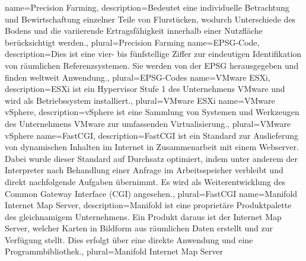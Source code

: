 {
  name=Precision Farming,
  description={Bedeutet eine individuelle Betrachtung und Bewirtschaftung einzelner Teile von Flurstücken, wodurch Unterschiede des Bodens und die variierende Ertragsfähigkeit innerhalb einer Nutzfläche berücksichtigt werden.},
  plural=Precision Farming
}
{
  name=EPSG-Code,
  description={Dies ist eine vier- bis fünfstellige Ziffer zur eindeutigen Identifikation von räumlichen Referenzsystemen. Sie werden von der EPSG herausgegeben und finden weltweit Anwendung.},
  plural=EPSG-Codes
}
{
  name=VMware ESXi,
  description={ESXi ist ein Hypervisor Stufe 1 des Unternehmens VMware und wird als Betriebssystem installiert.},
  plural=VMware ESXi
}
{
  name=VMware vSphere,
  description={vSphere ist eine Sammlung von Systemen und Werkzeugen des Unternehmens VMware zur umfassenden Virtualisierung.},
  plural=VMware vSphere
}
{
  name=FastCGI,
  description={FastCGI ist ein Standard zur Auslieferung von dynamischen Inhalten im Internet in Zusammenarbeit mit einem Webserver. Dabei wurde dieser Standard auf Durchsatz optimiert, indem unter anderem der Interpreter nach Behandlung einer Anfrage im Arbeitsspeicher verbleibt und direkt nachfolgende Aufgaben übernimmt. Es wird als Weiterentwicklung des Common Gateway Interface (CGI) angesehen.},
  plural=FastCGI
}
{
  name=Manifold Internet Map Server,
  description={Manifold ist eine proprietäre Produktpalette des gleichnamigem Unternehmens. Ein Produkt daraus ist der Internet Map Server, welcher Karten in Bildform aus räumlichen Daten erstellt und zur Verfügung stellt. Dies erfolgt über eine direkte Anwendung und eine Programmbibliothek.},
  plural=Manifold Internet Map Server
}